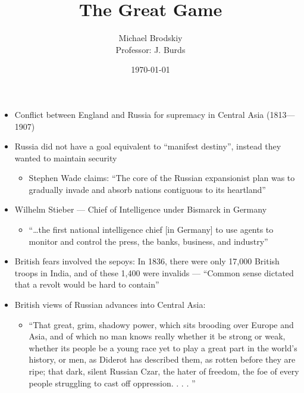 

\title{The Great Game}
\date{\today}
\author{Michael Brodskiy\\ \small Professor: J. Burds}



\maketitle

\begin{itemize}

  \item Conflict between England and Russia for supremacy in Central Asia (1813—1907)

  \item Russia did not have a goal equivalent to ``manifest destiny'', instead they wanted to maintain security

    \begin{itemize}

      \item Stephen Wade claims: ``The core of the Russian expansionist plan was to gradually invade and absorb nations contiguous to its heartland''

    \end{itemize}

  \item Wilhelm Stieber — Chief of Intelligence under Bismarck in Germany

    \begin{itemize}

      \item ``\ldots the first national intelligence chief [in Germany] to use agents to monitor and control the press, the banks, business, and industry''

    \end{itemize}

  \item British fears involved the sepoys: In 1836, there were only 17,000 British troops in India, and of these 1,400 were invalids — ``Common sense dictated that a revolt would be hard to contain''

  \item British views of Russian advances into Central Asia:

    \begin{itemize}

      \item ``That great, grim, shadowy power, which sits brooding over Europe and Asia, and of which no man knows really whether it be strong or weak, whether its people be a young race yet to play a great part in the world's history, or men, as Diderot has described them, as rotten before they are ripe; that dark, silent Russian Czar, the hater of freedom, the foe of every people struggling to cast off oppression. . . . ''


\end{itemize}
\end{itemize}
